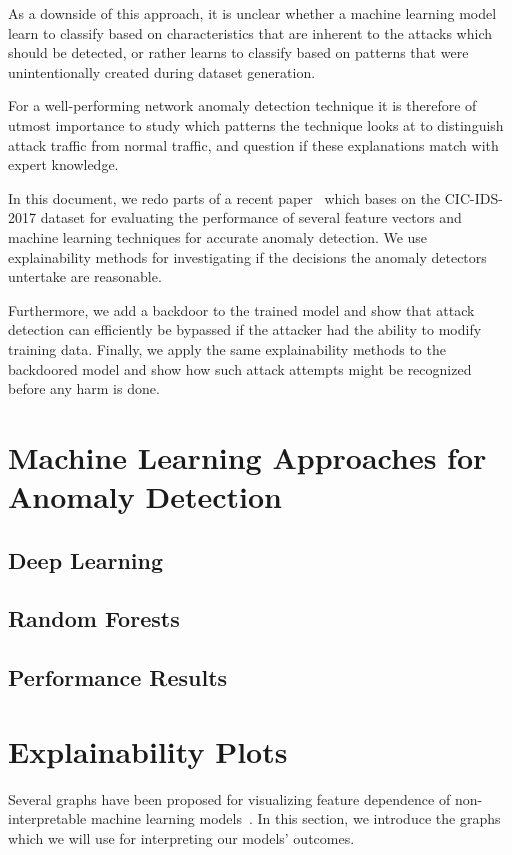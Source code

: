\documentclass[sigconf,nonacm]{acmart}
\begin{document}
As a downside of this approach, it is unclear whether a machine learning model learn to classify based on characteristics that are inherent to the attacks which should be detected, or rather learns to classify based on patterns that were unintentionally created during dataset generation.

For a well-performing network anomaly detection technique it is therefore of utmost importance to study which patterns the technique looks at to distinguish attack traffic from normal traffic, and question if these explanations match with expert knowledge.

In this document, we redo parts of a recent paper~\cite{fares} which bases on the CIC-IDS-2017 dataset for evaluating the performance of several feature vectors and machine learning techniques for accurate anomaly detection. We use explainability methods for investigating if the decisions the anomaly detectors untertake are reasonable.

Furthermore, we add a backdoor to the trained model and show that attack detection can efficiently be bypassed if the attacker had the ability to modify training data. Finally, we apply the same explainability methods to the backdoored model and show how such attack attempts might be recognized before any harm is done.

\section{Machine Learning Approaches for Anomaly Detection} \label{sec:ml_approaches}
\subsection{Deep Learning}
\subsection{Random Forests}

\subsection{Performance Results}
\section{Explainability Plots}
Several graphs have been proposed for visualizing feature dependence of non-interpretable machine learning models~\cite{goldstein2015peeking, friedman2001greedy, apley2016visualizing}.
In this section, we introduce the graphs which we will use for interpreting our models' outcomes. 
\end{document}
